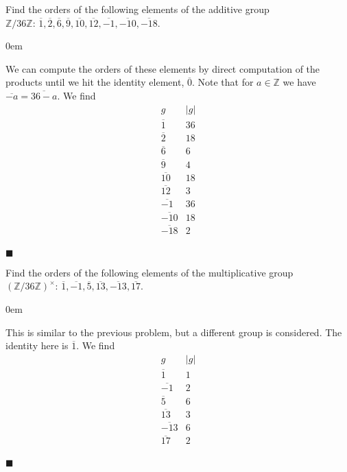 \documentclass[12pt]{article}
\renewcommand{\qed}{\hfill$\blacksquare$}
\renewenvironment{proof}{\begin{addmargin}[1em]{0em}\begin{newproof}}{\end{newproof}\end{addmargin}\qed}
\newenvironment{problem}[2][Exercise]{\begin{trivlist}
\item[\hskip \labelsep {\bfseries #1}\hskip \labelsep {\bfseries #2.}]}{\end{trivlist}}
\begin{document}
\begin{problem}{1.1.13}
Find the orders of the following elements of the additive group $\mathbb{Z}/36\mathbb{Z}: \, \overline{1},\overline{2},\overline{6},\overline{9},\overline{10},\overline{12},\overline{-1},\overline{-10},\overline{-18}$.
\end{problem}
\begin{proof}
We can compute the orders of these elements by direct computation of the products until we hit the identity element, $\overline{0}$. Note that for $a\in \mathbb{Z}$ we have $\overline{-a} = \overline{36-a}$. We find
\begin{equation*}
    \begin{array}{c|c}
        g & \left|g\right| \\ \hline
        \overline{1} & 36 \\
        \overline{2} & 18 \\
        \overline{6} & 6 \\
        \overline{9} & 4 \\
        \overline{10} & 18 \\
        \overline{12} & 3 \\
        \overline{-1} & 36 \\
        \overline{-10} & 18 \\
        \overline{-18} & 2 \\
    \end{array}
\end{equation*}
\end{proof}


\begin{problem}{1.1.14}
Find the orders of the following elements of the multiplicative group $\left(\mathbb{Z}/36\mathbb{Z}\right)^{\times}: \, \overline{1},\overline{-1},\overline{5},\overline{13},\overline{-13},\overline{17}$.
\end{problem}
\begin{proof}
This is similar to the previous problem, but a different group is considered. The identity here is $\overline{1}$. We find
\begin{equation*}
    \begin{array}{c|c}
    g & \left|g\right| \\
    \overline{1} & 1 \\
    \overline{-1} & 2 \\
    \overline{5} & 6 \\
    \overline{13} & 3 \\
    \overline{-13} & 6 \\
    \overline{17} & 2 \\
    \end{array}
\end{equation*}
\end{proof}
\end{document}
